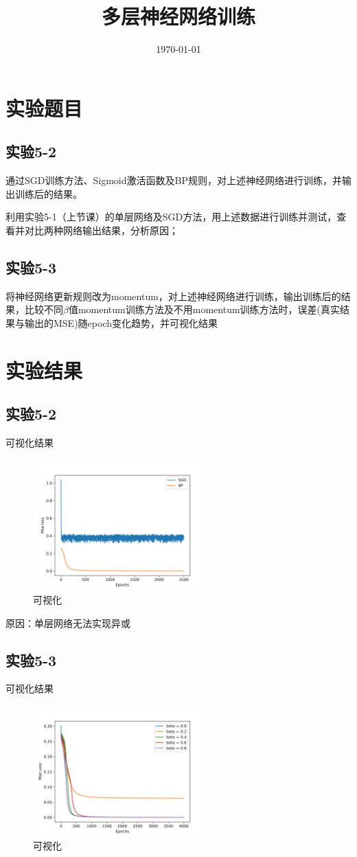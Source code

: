 \documentclass{../source/Experiment}
\title{多层神经网络训练}
\date{\today}
\begin{document}
    \makecover
    \section{实验题目}
        \subsection{实验5-2}

        通过SGD训练方法、Sigmoid激活函数及BP规则，对上述神经网络进行训练，并输出训练后的结果。
        
        利用实验5-1（上节课）的单层网络及SGD方法，用上述数据进行训练并测试，查看并对比两种网络输出结果，分析原因；
        
        \subsection{实验5-3}
        
        将神经网络更新规则改为momentum，对上述神经网络进行训练，输出训练后的结果，比较不同$\beta$值momentum训练方法及不用momentum训练方法时，误差(真实结果与输出的MSE)随epoch变化趋势，并可视化结果

    \section{实验结果}
        \subsection{实验5-2}
            可视化结果
            \begin{figure}[H]
                \centering
                \includegraphics[width = 0.6\textwidth]{Part5/参考/lab5_2.png}
                \caption{可视化}
            \end{figure}

        原因：单层网络无法实现异或

        \subsection{实验5-3}
        可视化结果
        \begin{figure}[H]
            \centering
            \includegraphics[width = 0.6\textwidth]{Part5/参考/lab5_3.jpg}
            \caption{可视化}
        \end{figure}
\end{document}
